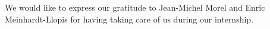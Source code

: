 
We would like to express our gratitude to Jean-Michel Morel and Enric Meinhardt-Llopis for having taking care of us during our internship.
